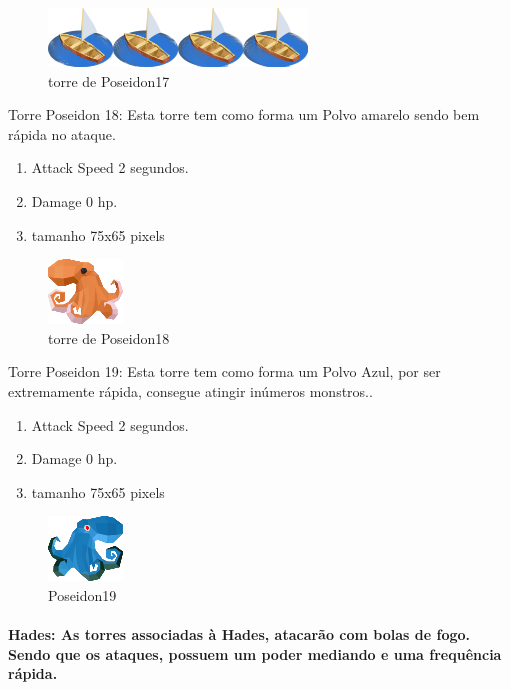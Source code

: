 \documentclass[11pt]{article} %
\begin{document}
\begin{figure}[!htp]
\centering
\includegraphics[scale=1.3]{res/towers/tower_17.png}
\caption{torre de Poseidon17}
\end{figure}

Torre Poseidon 18: Esta torre tem como forma um Polvo amarelo sendo bem rápida no ataque.
\begin{enumerate}
\item Attack Speed 2 segundos.
\item Damage 0 hp.
\item tamanho 75x65 pixels
\end{enumerate}

\begin{figure}[!htp]
\centering
\includegraphics[scale=1.3]{res/towers/tower_18.png}
\caption{torre de Poseidon18}
\end{figure}

Torre Poseidon 19: Esta torre tem como forma um Polvo Azul, por ser extremamente rápida, consegue atingir inúmeros monstros..
\begin{enumerate}
\item Attack Speed 2 segundos.
\item Damage 0 hp.
\item tamanho 75x65 pixels
\end{enumerate}

\begin{figure}[!htp]
\centering
\includegraphics[scale=1.3]{res/towers/tower_19.png}
\caption{Poseidon19}
\end{figure}

\newpage

\paragraph{{\Large Hades}: As torres associadas à Hades, atacarão com bolas de fogo. Sendo que os ataques, possuem um poder mediando e uma frequência rápida.}
\end{document}
